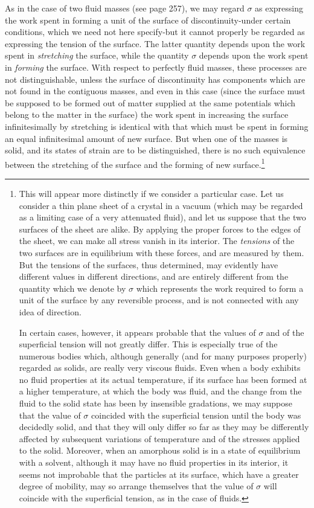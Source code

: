 \documentclass[12pt]{memoir}
\begin{document}
As in the case of two fluid masses (see page 257), we may regard $\sigma$ as expressing the work spent in forming a unit of the surface of discontinuity-under certain conditions, which we need not here specify-but it cannot properly be regarded as expressing the tension of the surface. The latter quantity depends upon the work spent in \textit{stretching} the surface, while the quantity $\sigma$ depends upon the work spent in \textit{forming} the surface. With respect to perfectly fluid masses, these processes are not distinguishable, unless the surface of discontinuity has components which are not found in the contiguous masses, and even in this case (since the surface must be supposed to be formed out of matter supplied at the same potentials which belong to the matter in the surface) the work spent in increasing the surface infinitesimally by stretching is identical with that which must be spent in forming an equal infinitesimal amount of new surface. But when one of the masses is solid, and its states of strain are to be distinguished, there is no such equivalence between the stretching of the surface and the forming of new surface.\footnote{This will appear more distinctly if we consider a particular case. Let us consider a thin plane sheet of a crystal in a vacuum (which may be regarded as a limiting case of a very attenuated fluid), and let us suppose that the two surfaces of the sheet are alike. By applying the proper forces to the edges of the sheet, we can make all stress vanish in its interior. The \textit{tensions} of the two surfaces are in equilibrium with these forces, and are measured by them. But the tensions of the surfaces, thus determined, may evidently have different values in different directions, and are entirely different from the quantity which we denote by $\sigma$ which represents the work required to form a unit of the surface by any reversible process, and is not connected with any idea of direction. \par
In certain cases, however, it appears probable that the values of $\sigma$ and of the superficial tension will not greatly differ. This is especially true of the numerous bodies which, although generally (and for many purposes properly) regarded as solids, are really very viscous fluids. Even when a body exhibits no fluid properties at its actual temperature, if its surface has been formed at a higher temperature, at which the body was fluid, and the change from the fluid to the solid state has been by insensible gradations, we may suppose that the value of $\sigma$ coincided with the superficial tension until the body was decidedly solid, and that they will only differ so far as they may be differently affected by subsequent variations of temperature and of the stresses applied to the solid. Moreover, when an amorphous solid is in a state of equilibrium with a solvent, although it may have no fluid properties in its interior, it seems not improbable that the particles at its surface, which have a greater degree of mobility, may so arrange themselves that the value of $\sigma$ will coincide with the superficial tension, as in the case of fluids.}
\end{document}
